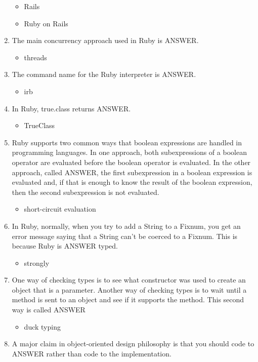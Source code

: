 \documentclass{exam}
\begin{document}
\begin{enumerate}
\begin{itemize}
\item Rails
\item Ruby on Rails
\end{itemize}
\item The main concurrency approach used in Ruby is ANSWER.
\begin{itemize}
\item threads
\end{itemize}
\item The command name for the Ruby interpreter is ANSWER.
\begin{itemize}
\item irb
\end{itemize}
\item In Ruby, true.class returns ANSWER.
\begin{itemize}
\item TrueClass
\end{itemize}
\item Ruby supports two common ways that boolean expressions are handled in programming languages.  In one approach, both subexpressions of a boolean operator are evaluated before the boolean operator is evaluated.  In the other approach, called ANSWER, the first subexpression in a boolean expression is evaluated and, if that is enough to know the result of the boolean expression, then the second subexpression is not evaluated.
\begin{itemize}
\item short-circuit evaluation
\end{itemize}
\item In Ruby, normally, when you try to add a String to a Fixnum, you get an error message saying that a String can't be coerced to a Fixnum.  This is because Ruby is ANSWER typed.
\begin{itemize}
\item strongly
\end{itemize}
\item One way of checking types is to see what constructor was used to create an object that is a parameter.  Another way of checking types is to wait until a method is sent to an object and see if it supports the method.  This second way is called ANSWER
\begin{itemize}
\item duck typing
\end{itemize}
\item A major claim in object-oriented design philosophy is that you should code to ANSWER rather than code to the implementation.

\end{enumerate}
\end{document}
